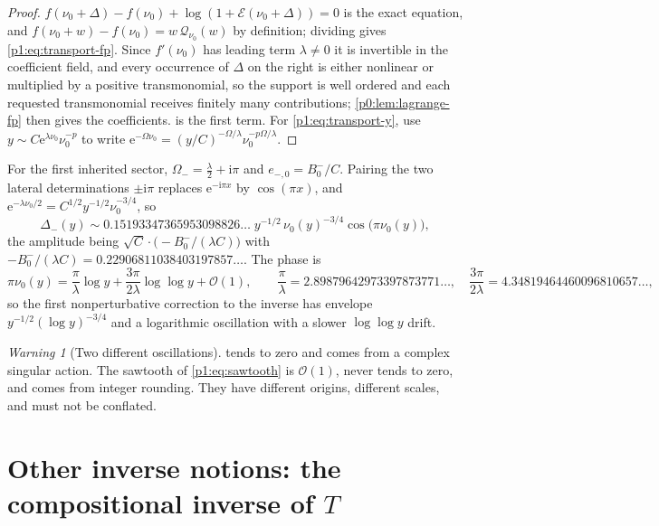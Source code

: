 \documentclass[11pt,a4paper,oneside]{book}
\theoremstyle{plain}
\theoremstyle{definition}
\theoremstyle{remark}
\newtheorem{warning}[theorem]{Warning}
\newcommand{\e}{\mathrm{e}}
\newcommand{\ii}{\mathrm{i}}
\newcommand{\bigO}{\mathcal{O}}
\begin{document}
\begin{proof}
$f(\nu_0+\Delta)-f(\nu_0)+\log(1+\mathcal E(\nu_0+\Delta))=0$ is the exact equation, and
$f(\nu_0+w)-f(\nu_0)=w\,\mathcal Q_{\nu_0}(w)$ by definition; dividing gives
\cref{p1:eq:transport-fp}.  Since $f'(\nu_0)$ has leading term $\lambda\ne0$ it is invertible
in the coefficient field, and every occurrence of $\Delta$ on the right is either nonlinear or
multiplied by a positive transmonomial, so the support is well ordered and each requested
transmonomial receives finitely many contributions; \cref{p0:lem:lagrange-fp} then gives the
coefficients.  is the first term.  For \cref{p1:eq:transport-y},
use $y\sim C\e^{\lambda\nu_0}\nu_0^{-p}$ to write
$\e^{-\Omega\nu_0}=(y/C)^{-\Omega/\lambda}\nu_0^{-p\Omega/\lambda}$.
\end{proof}

For the first inherited sector, $\Omega_-=\tfrac\lambda2+\ii\pi$ and $e_{-,0}=B^-_0/C$.
Pairing the two lateral determinations $\pm\ii\pi$ replaces $\e^{-\ii\pi x}$ by $\cos(\pi x)$,
and $\e^{-\lambda\nu_0/2}=C^{1/2}y^{-1/2}\nu_0^{-3/4}$, so
\begin{equation}
 \boxed{\;
 \Delta_-(y)\sim
 0.15193347365953098826\ldots\;
 y^{-1/2}\,\nu_0(y)^{-3/4}\cos\bigl(\pi\nu_0(y)\bigr),\;}
 \label{p1:eq:minus-inverse}
\end{equation}
the amplitude being $\sqrt C\cdot\bigl(-B^-_0/(\lambda C)\bigr)$ with $-B^-_0/(\lambda
C)=0.22906811038403197857\ldots$.  The phase is
\begin{equation}
 \pi\nu_0(y)=\frac{\pi}{\lambda}\log y
 +\frac{3\pi}{2\lambda}\log\log y+\bigO(1),
 \qquad
 \frac{\pi}{\lambda}=2.89879642973397873771\ldots,
 \quad
 \frac{3\pi}{2\lambda}=4.34819464460096810657\ldots,
 \label{p1:eq:minus-phase}
\end{equation}
so the first nonperturbative correction to the inverse has envelope $y^{-1/2}(\log y)^{-3/4}$
and a logarithmic oscillation with a slower $\log\log y$ drift.

\begin{warning}[Two different oscillations]
\label{p1:rem:two-oscillations}
 tends to zero and comes from a complex singular action.  The
sawtooth of \cref{p1:eq:sawtooth} is $\bigO(1)$, never tends to zero, and comes from integer
rounding.  They have different origins, different scales, and must not be conflated.
\end{warning}

\section{Other inverse notions: the compositional inverse of $T$}
\label{p1:sec:compositional}
\end{document}

